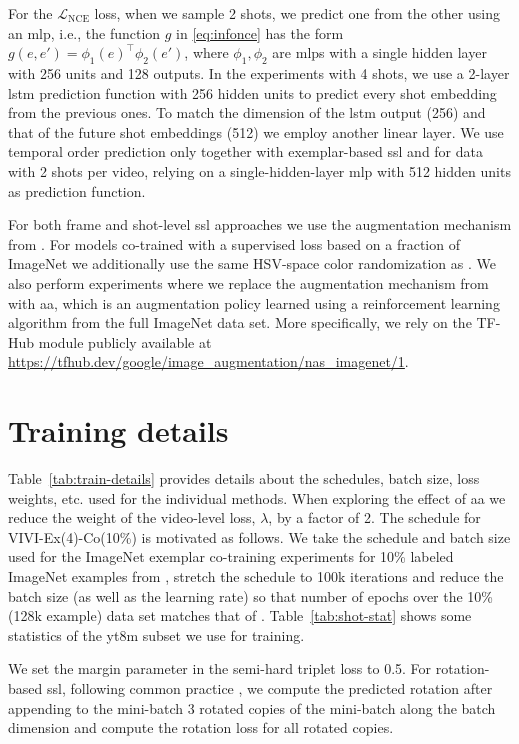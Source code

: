 \documentclass[10pt,twocolumn,letterpaper]{article}
\newcommand{\Lnce}{\mathcal L_\text{NCE}}
\begin{document}
For the $\Lnce$ loss, when we sample 2 shots, we predict one from the other using an \gls{mlp}, i.e., the function $g$ in \eqref{eq:infonce} has the form $g(e,e')=\phi_1(e)^\top \phi_2(e')$, where $\phi_1, \phi_2$ are \glspl{mlp} with a single hidden layer with 256 units and 128 outputs.
In the experiments with 4 shots, we use a 2-layer \gls{lstm} prediction function with 256 hidden units to predict every shot embedding from the previous ones. To match the dimension of the \gls{lstm} output (256) and that of the future shot embeddings (512) we employ another linear layer. 
We use temporal order prediction only together with exemplar-based \gls{ssl} and for data with 2 shots per video, relying on a single-hidden-layer \gls{mlp} with 512 hidden units as prediction function.

For both frame and shot-level \gls{ssl} approaches we use the augmentation mechanism from \cite{szegedy2015going}. For models co-trained with a supervised loss based on a fraction of ImageNet we additionally use the same HSV-space color randomization as \cite{zhai2019s4l}.
We also perform experiments where we replace the augmentation mechanism from \cite{szegedy2015going} with \gls{aa}, which is an augmentation policy learned using a reinforcement learning algorithm from the full ImageNet data set. More specifically, we rely on the TF-Hub module publicly available at \url{https://tfhub.dev/google/image_augmentation/nas_imagenet/1}.

\section{Training details}

Table~\ref{tab:train-details} provides details about the schedules, batch size, loss weights, etc. used for the individual methods. When exploring the effect of \gls{aa} we reduce the weight of the video-level loss, $\lambda$, by a factor of 2. The schedule for VIVI-Ex(4)-Co(10\%) is motivated as follows. We take the schedule and batch size used for the ImageNet exemplar co-training experiments for 10\% labeled ImageNet examples from \cite{zhai2019s4l}, stretch the schedule to 100k iterations and reduce the batch size (as well as the learning rate) so that number of epochs over the 10\% (128k example) data set matches that of \cite{zhai2019s4l}. Table~\ref{tab:shot-stat} shows some statistics of the \gls{yt8m} subset we use for training.

We set the margin parameter in the semi-hard triplet loss \cite{schroff2015facenet} to 0.5. For rotation-based \gls{ssl}, following common practice \cite{gidaris2018unsupervised, kolesnikov2019revisiting}, we compute the predicted rotation after appending to the mini-batch 3 rotated copies of the mini-batch along the batch dimension and compute the rotation loss for all rotated copies.
\end{document}
